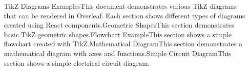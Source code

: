 TikZ Diagrams ExamplesThis document demonstrates various TikZ diagrams that can be rendered in Overleaf. Each section shows different types of diagrams created using React components.Geometric ShapesThis section demonstrates basic TikZ geometric shapes.Flowchart ExampleThis section shows a simple flowchart created with TikZ.Mathematical DiagramThis section demonstrates a mathematical diagram with axes and functions.Simple Circuit DiagramThis section shows a simple electrical circuit diagram.